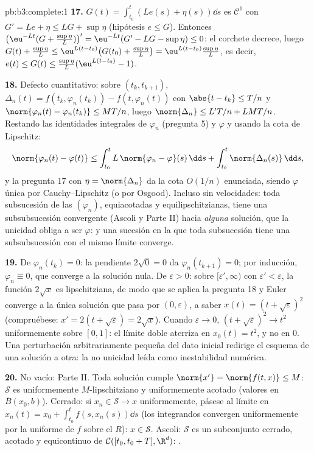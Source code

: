 \begin{solution}{pb:b3:complete:1}
\textbf{17.} $G(t) = \int_{t_0}^t(Le(s) + \eta(s))\dd s$ es
$\mathcal C^1$ con $G' = Le + \eta \leq LG + \sup\eta$ (hipótesis
$e \leq G$). Entonces $\bigl(\eu^{-Lt}(G +
\tfrac{\sup\eta}L)\bigr)' = \eu^{-Lt}(G' - LG - \sup\eta)
\leq 0$: el corchete decrece, luego $G(t) + \frac{\sup\eta}L
\leq \eu^{L(t - t_0)}\bigl(G(t_0) + \frac{\sup\eta}L\bigr) =
\eu^{L(t-t_0)}\frac{\sup\eta}L$, es decir, $e(t) \leq G(t) \leq
\frac{\sup\eta}L(\eu^{L(t-t_0)} - 1)$.

\textbf{18.} Defecto cuantitativo: sobre $(t_k, t_{k+1})$,
$\Delta_n(t) = f(t_k, \varphi_n(t_k)) - f(t, \varphi_n(t))$
con $\abs{t - t_k} \leq T/n$ y $\norm{\varphi_n(t) -
\varphi_n(t_k)} \leq MT/n$, luego $\norm{\Delta_n} \leq L'T/n +
LMT/n$. Restando las identidades integrales de $\varphi_n$ (pregunta 5)
y $\varphi$ y usando la cota de Lipschitz:
\[
\norm{\varphi_n(t) - \varphi(t)} \leq
\int_{t_0}^t L\,\norm{\varphi_n - \varphi}(s)\,\dd s +
\int_{t_0}^t\norm{\Delta_n(s)}\,\dd s,
\]
y la pregunta 17 con $\eta = \norm{\Delta_n}$ da la cota $O(1/n)$
enunciada, siendo $\varphi$ única por Cauchy--Lipschitz (o por Osgood).
Incluso sin velocidades: toda subsucesión de las $(\varphi_n)$,
equiacotadas y equilipschitzianas, tiene una subsubsucesión convergente
(Ascoli y Parte II) hacia \emph{alguna} solución, que la unicidad obliga
a ser $\varphi$: y una sucesión en la que toda subsucesión tiene una
subsubsucesión con el mismo límite converge.

\textbf{19.} De $\varphi_n(t_k) = 0$: la pendiente $2\sqrt0 =
0$ da $\varphi_n(t_{k+1}) = 0$; por inducción, $\varphi_n
\equiv 0$, que converge a la solución nula. De $\varepsilon > 0$: sobre
$[\varepsilon', \infty)$ con $\varepsilon' < \varepsilon$, la función
$2\sqrt x$ es lipschitziana, de modo que se aplica la pregunta 18 y
Euler converge a la única solución que pasa por $(0, \varepsilon)$, a
saber $x(t) =
(t + \sqrt\varepsilon)^2$ (compruébese: $x' = 2(t + \sqrt
\varepsilon) = 2\sqrt x$). Cuando $\varepsilon \to 0$, $(t +
\sqrt\varepsilon)^2 \to t^2$ uniformemente sobre $[0,1]$: el límite
doble aterriza en $x_0(t) = t^2$, y no en $0$. Una perturbación
arbitrariamente pequeña del dato inicial redirige el esquema de una
solución a otra: la no unicidad leída como inestabilidad numérica.

\textbf{20.} No vacío: Parte II. Toda solución cumple
$\norm{x'} = \norm{f(t, x)} \leq M$: $\mathcal S$ es uniformemente
$M$-lipschitziano y uniformemente acotado (valores en $\bar B(x_0, b)$).
Cerrado: si $x_n \in \mathcal S \to x$ uniformemente, pásese al límite
en $x_n(t) = x_0 +
\int_{t_0}^tf(s, x_n(s))\dd s$ (los integrandos convergen uniformemente
por la  uniforme de $f$
sobre el  $R$):
$x \in \mathcal S$. Ascoli: $\mathcal S$ es un subconjunto cerrado,
acotado y equicontinuo de
$\mathcal C([t_0, t_0+T],
\R^d)$: .


\end{solution}
